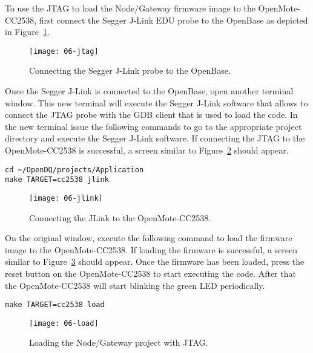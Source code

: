 To use the JTAG to load the Node/Gateway firmware image to the OpenMote-CC2538, first connect the Segger J-Link EDU probe to the OpenBase as depicted in Figure~\ref{fig:06-jtag}.

\begin{figure}[!ht]
    \centering
	\texttt{[image: 06-jtag]}
    \caption{Connecting the Segger J-Link probe to the OpenBase.}
    \label{fig:06-jtag}
\end{figure}

Once the Segger J-Link is connected to the OpenBase, open another terminal window. This new terminal will execute the Segger J-Link software that allows to connect the JTAG probe with the GDB client that is used to load the code. In the new terminal issue the following commands to go to the appropriate project directory and execute the Segger J-Link software. If connecting the JTAG to the OpenMote-CC2538 is successful, a screen similar to Figure~\ref{fig:06-jlink} should appear.

\begin{verbatim}
cd ~/OpenDQ/projects/Application
make TARGET=cc2538 jlink
\end{verbatim}

\begin{figure}[!ht]
    \centering
	\texttt{[image: 06-jlink]}
    \caption{Connecting the JLink to the OpenMote-CC2538.}
    \label{fig:06-jlink}
\end{figure}

On the original window, execute the following command to load the firmware image to the OpenMote-CC2538. If loading the firmware is successful, a screen similar to Figure~\ref{fig:06-load} should appear. Once the firmware has been loaded, press the reset button on the OpenMote-CC2538 to start executing the code. After that the OpenMote-CC2538 will start blinking the green LED periodically.

\begin{verbatim}
make TARGET=cc2538 load
\end{verbatim}

\begin{figure}[!ht]
    \centering
	\texttt{[image: 06-load]}
    \caption{Loading the Node/Gateway project with JTAG.}
    \label{fig:06-load}
\end{figure}


